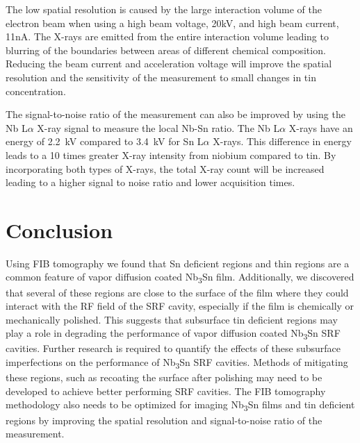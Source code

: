The low spatial resolution is caused by the large interaction volume of the electron beam when using a high beam voltage, 20kV, and high beam current, 11nA. The X-rays are emitted from the entire interaction volume leading to blurring of the boundaries between areas of different chemical composition. Reducing the beam current and acceleration voltage will improve the spatial resolution and the sensitivity of the measurement to small changes in tin concentration. 

The signal-to-noise ratio of the measurement can also be improved by using the Nb L$\alpha$ X-ray signal to measure the local Nb-Sn ratio. The Nb L$\alpha$ X-rays have an energy of \qty{2.2}{\kilo\volt} compared to \qty{3.4}{\kilo\volt} for Sn L$\alpha$ X-rays\cite{osti_4794153}. This difference in energy leads to a 10 times greater X-ray intensity from niobium compared to tin. By incorporating both types of X-rays, the total X-ray count will be increased leading to a higher signal to noise ratio and lower acquisition times.


\section{Conclusion}

Using FIB tomography we found that Sn deficient regions and thin regions are a common feature of vapor diffusion coated Nb\textsubscript{3}Sn film. Additionally, we discovered that several of these regions are close to the surface of the film where they could interact with the RF field of the SRF cavity, especially if the film is chemically or mechanically polished. This suggests that subsurface tin deficient regions may play a role in degrading the performance of vapor diffusion coated Nb\textsubscript{3}Sn SRF cavities. Further research is required to quantify the effects of these subsurface imperfections on the performance of Nb\textsubscript{3}Sn SRF cavities. Methods of mitigating these regions, such as recoating the surface after polishing may need to be developed to achieve better performing SRF cavities. The FIB tomography methodology also needs to be optimized for imaging Nb\textsubscript{3}Sn films and tin deficient regions by improving the spatial resolution and signal-to-noise ratio of the measurement.
